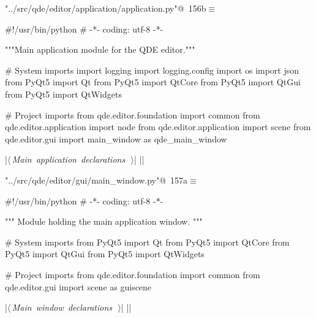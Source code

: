 \documentclass[%
    a4paper,    %
    justified,  %
    nobib,      %
    openany     %
]{tufte-book}
\begin{document}
\begin{flushleft} \small
\begin{minipage}{\linewidth}\label{scrap167}\raggedright\small
{} \verb@"../src/qde/editor/application/application.py"@\nobreak\ {\footnotesize {156b}}$\equiv$
\vspace{-1ex}
\begin{pythoncode}
#!/usr/bin/python
# -*- coding: utf-8 -*-

"""Main application module for the QDE editor."""

# System imports
import logging
import logging.config
import os
import json
from PyQt5 import Qt
from PyQt5 import QtCore
from PyQt5 import QtGui
from PyQt5 import QtWidgets

# Project imports
from qde.editor.foundation import common
from qde.editor.application import node
from qde.editor.application import scene
from qde.editor.gui import main_window as qde_main_window


|\hbox{$\langle\,${\itshape Main application declarations}\nobreak\ {\footnotesize {}}$\,\rangle$}|
|\NWsep|
\end{pythoncode}
\vspace{1.5ex}
\footnotesize
\begin{list}{}{\setlength{\itemsep}{-\parsep}\setlength{\itemindent}{-\leftmargin}}

\item{}
\end{list}
\end{minipage}\vspace{4ex}
\end{flushleft}
\begin{flushleft} \small
\begin{minipage}{\linewidth}\label{scrap168}\raggedright\small
{} \verb@"../src/qde/editor/gui/main_window.py"@\nobreak\ {\footnotesize {157a}}$\equiv$
\vspace{-1ex}
\begin{pythoncode}
#!/usr/bin/python
# -*- coding: utf-8 -*-

""" Module holding the main application window. """

# System imports
from PyQt5 import Qt
from PyQt5 import QtCore
from PyQt5 import QtGui
from PyQt5 import QtWidgets

# Project imports
from qde.editor.foundation import common
from qde.editor.gui import scene as guiscene


|\hbox{$\langle\,${\itshape Main window declarations}\nobreak\ {\footnotesize {}}$\,\rangle$}|
|\NWsep|
\end{pythoncode}
\vspace{1.5ex}
\footnotesize
\begin{list}{}{\setlength{\itemsep}{-\parsep}\setlength{\itemindent}{-\leftmargin}}

\item{}
\end{list}
\end{minipage}\vspace{4ex}
\end{flushleft}
\end{document}
